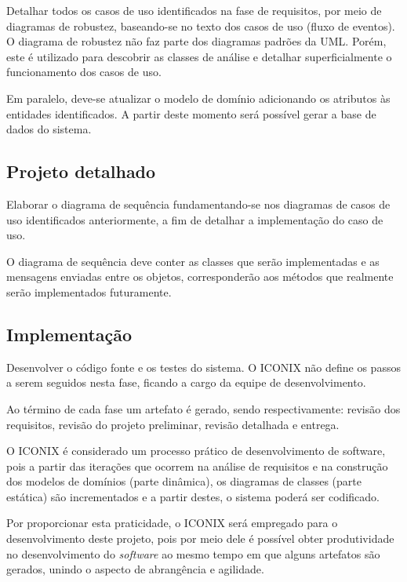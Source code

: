 Detalhar todos os casos de uso identificados na fase de requisitos, por meio de diagramas de robustez, baseando-se no texto dos casos de uso (fluxo de eventos). O diagrama de robustez não faz parte dos diagramas padrões da UML. Porém, este é utilizado para descobrir as classes de análise e detalhar superficialmente o funcionamento dos casos de uso.

Em paralelo, deve-se atualizar o modelo de domínio adicionando os atributos às entidades identificados. A partir deste momento será possível gerar a base de dados do sistema.


\subsection{Projeto detalhado}

Elaborar o diagrama de sequência fundamentando-se nos diagramas de casos de uso identificados anteriormente, a fim de detalhar a implementação do caso de uso.

O diagrama de sequência deve conter as classes que serão implementadas e as mensagens enviadas entre os objetos, corresponderão aos métodos que realmente serão implementados futuramente.
 

\subsection{Implementação}

Desenvolver o código fonte e os testes do sistema. O ICONIX não define os passos a serem seguidos nesta fase, ficando a cargo da equipe de desenvolvimento.
 
Ao término de cada fase um artefato é gerado, sendo respectivamente: revisão dos requisitos, revisão do projeto preliminar, revisão detalhada e entrega.

O ICONIX é considerado um processo prático de desenvolvimento de software, pois a partir das iterações que ocorrem na análise de requisitos e na construção dos modelos de domínios (parte dinâmica), os diagramas de classes (parte estática) são incrementados e a partir destes, o sistema poderá ser codificado.


Por proporcionar esta praticidade, o ICONIX será empregado para o desenvolvimento deste projeto, pois por meio dele é possível obter produtividade no desenvolvimento do \textit{software} ao mesmo tempo em que alguns artefatos são gerados, unindo o aspecto de abrangência e agilidade.
